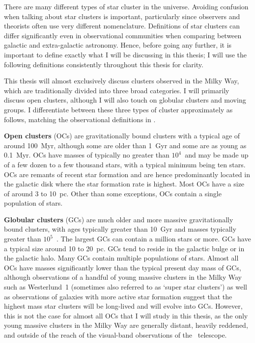 There are many different types of star cluster in the universe. Avoiding confusion when talking about star clusters is important, particularly since observers and theorists often use very different nomenclature. Definitions of star clusters can differ significantly even in observational communities when comparing between galactic and extra-galactic astronomy. Hence, before going any further, it is important to define exactly what I will be discussing in this thesis; I will use the following definitions consistently throughout this thesis for clarity.

This thesis will almost exclusively discuss clusters observed in the Milky Way, which are traditionally divided into three broad categories. I will primarily discuss open clusters, although I will also touch on globular clusters and moving groups. I differentiate between these three types of cluster approximately as follows, matching the observational definitions in \cite{portegies_zwart_young_2010}.

\textbf{Open clusters} (OCs) are gravitationally bound clusters with a typical age of around 100~Myr, although some are older than 1~Gyr and some are as young as 0.1~Myr. OCs have masses of typically no greater than $10^4$~\MSun and may be made up of a few dozen to a few thousand stars, with a typical minimum being ten stars. OCs are remants of recent star formation and are hence predominantly located in the galactic disk where the star formation rate is highest. Most OCs have a size of around 3 to 10~pc. Other than some exceptions, OCs contain a single population of stars. 

\textbf{Globular clusters} (GCs) are much older and more massive gravitationally bound clusters, with ages typically greater than 10~Gyr and masses typically greater than $10^5$~\MSun. The largest GCs can contain a million stars or more. GCs have a typical size around 10 to 20~pc. GCs tend to reside in the galactic bulge or in the galactic halo. Many GCs contain multiple populations of stars. Almost all OCs have masses significantly lower than the typical present day mass of GCs, although observations of a handful of young massive clusters in the Milky Way such as Westerlund~1 (sometimes also referred to as `super star clusters') as well as observations of galaxies with more active star formation suggest that the highest mass star clusters will be long-lived and will evolve into GCs. However, this is not the case for almost all OCs that I will study in this thesis, as the only young massive clusters in the Milky Way are generally distant, heavily reddened, and outside of the reach of the visual-band observations of the \gaia\ telescope.

